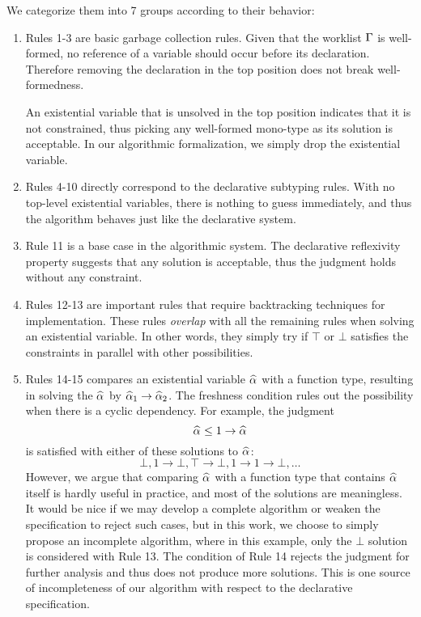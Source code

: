 We categorize them into 7 groups according to their behavior:
\begin{enumerate}
    \item Rules 1-3 are basic garbage collection rules.
        Given that the worklist $\Gamma$ is well-formed,
        no reference of a variable should occur before its declaration.
        Therefore removing the declaration in the top position does not break well-formedness.

        An existential variable that is unsolved in the top position indicates
        that it is not constrained,
        thus picking any well-formed mono-type as its solution is acceptable.
        In our algorithmic formalization, we simply drop the existential variable.

    \item Rules 4-10 directly correspond to the declarative subtyping rules.
        With no top-level existential variables,
        there is nothing to guess immediately,
        and thus the algorithm behaves just like the declarative system.

    \item Rule 11 is a base case in the algorithmic system.
        The declarative reflexivity property suggests that any solution is acceptable,
        thus the judgment holds without any constraint.
    
    \item Rules 12-13 are important rules that require backtracking techniques
        for implementation.
        These rules \emph{overlap} with all the remaining rules when solving
        an existential variable.
        In other words, they simply try if $\top$ or $\bot$ satisfies the constraints
        in parallel with other possibilities.
    
    \item Rules 14-15 compares an existential variable $\al$ with a function type,
        resulting in solving the $\al$ by $\al[1] \to \al[2]$.
        The freshness condition rules out the possibility
        when there is a cyclic dependency.
        For example, the judgment
        \[\al \le 1 \to \al\]
        is satisfied with either of these solutions to $\al$:
        \[ \bot, 1 \to \bot, \top \to \bot, 1 \to 1 \to \bot, \ldots \]
        However, we argue that comparing $\al$ with a function type
        that contains $\al$ itself is hardly useful in practice,
        and most of the solutions are meaningless.
        It would be nice if we may develop a complete algorithm or
        weaken the specification to reject such cases,
        but in this work, we choose to simply propose an incomplete algorithm,
        where in this example, only the $\bot$ solution is considered with Rule 13.
        The condition of Rule 14 rejects the judgment for further analysis
        and thus does not produce more solutions.
        This is one source of incompleteness of our algorithm with respect to the declarative specification.
    

\end{enumerate}
